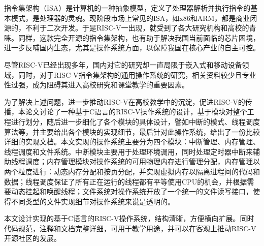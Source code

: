 \begin{cabstract}

指令集架构（ISA）是计算机的一种抽象模型，定义了处理器解析并执行指令的基本模式，是处理器的灵魂。现阶段市场上常见的ISA，如x86和ARM，都是商业闭源的，不利于二次开发。于是RISC-V一出现，就受到了各大研究机构和高校的青睐。同样，这款完全开源的指令集架构，也有助于解决我国当前面临的芯片困境，进一步反哺国内生态，尤其是操作系统方面，以保障我国在核心产业的自主可控。

尽管RISC-V已经出现多年，国内对它的研究却一直局限于嵌入式和移动设备领域，同时，对于RISC-V指令集架构的通用操作系统的研究，相关资料较少且专业性过强，成为阻碍其进入高校研究和课堂教学的重要因素。

为了解决上述问题，进一步推动RISC-V在高校教学中的沉淀，促进RISC-V的传播，本论文讨论了一种基于C语言的RISC-V操作系统的设计，基于模块对整个工程进行划分，随后进一步细化了各个模块的具体设计，譬如中断的模式、线程调度算法等，并主要给出各个模块的实现细节，最后针对此操作系统，给出了一份比较详细的实现文档。本文实现的操作系统主要分为四个模块：中断管理、内存管理、线程调度和文件系统。中断模块主要用于处理环境调用，同时处理定时器中断来辅助线程调度；内存管理模块对操作系统的可用物理内存进行管理分配，内存管理以两个粒度进行：动态内存分配和按页分配，并实现虚拟内存以隔离进程间的代码和数据；线程调度保证了所有正在运行的线程都有平等使用CPU的机会，并根据需要动态挂起和唤醒线程；文件系统对操作系统开放了一个统一的文件读写接口，使得不同类型的文件实现细节对操作系统来说是透明的。

本文设计实现的基于C语言的RISC-V操作系统，结构清晰，方便横向扩展。同时代码规范，注释和文档完整详细，可用于教学用途，并可以在客观上推动RISC-V开源社区的发展。

\end{cabstract}

